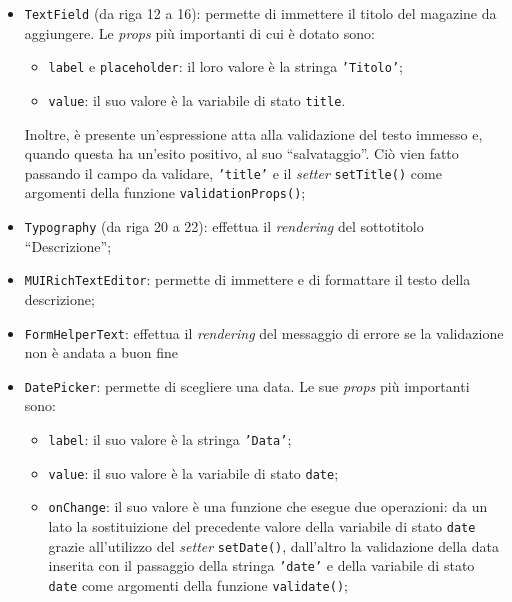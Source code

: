 \begin{itemize}
    \item \texttt{TextField} (da riga 12 a 16): permette di immettere il titolo del magazine da aggiungere. Le \textit{props} più importanti di cui è dotato sono:
        \begin{itemize}
            \item \texttt{label} e \texttt{placeholder}: il loro valore è la stringa \texttt{'Titolo'};
            
            \item \texttt{value}: il suo valore è la variabile di stato \texttt{title}.
        \end{itemize}
    Inoltre, è presente un'espressione atta alla validazione del testo immesso e, quando questa ha un'esito positivo, al suo “salvataggio”. Ciò vien fatto passando il campo da validare, \texttt{'title'} e il \textit{setter} \texttt{setTitle()} come argomenti della funzione \texttt{validationProps()};
    
    \item \texttt{Typography} (da riga 20 a 22): effettua il \textit{rendering} del sottotitolo “Descrizione”;
    
    \item \texttt{MUIRichTextEditor}: permette di immettere e di formattare il testo della descrizione;
    
    \item \texttt{FormHelperText}: effettua il \textit{rendering} del messaggio di errore se la validazione non è andata a buon fine
    
    \item \texttt{DatePicker}: permette di scegliere una data. Le sue \textit{props} più importanti sono:
    \begin{itemize}
        \item \texttt{label}: il suo valore è la stringa \texttt{'Data'};

        \item \texttt{value}: il suo valore è la variabile di stato \texttt{date};
        
        \item \texttt{onChange}: il suo valore è una funzione che esegue due operazioni: da un lato la sostituizione del precedente valore della variabile di stato \texttt{date} grazie all'utilizzo del \textit{setter} \texttt{setDate()}, dall'altro la validazione della data inserita con il passaggio della stringa \texttt{'date'} e della variabile di stato \texttt{date} come argomenti della funzione \texttt{validate()};
        

\end{itemize}
\end{itemize}
